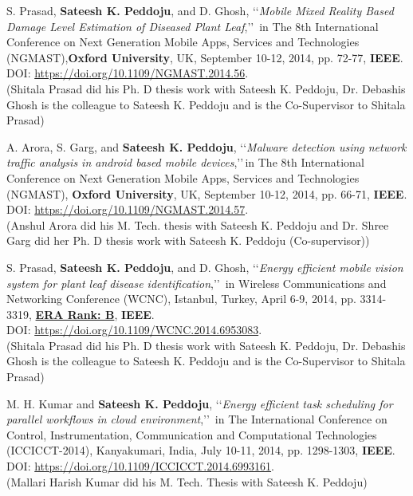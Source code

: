 \begin{etaremune}
	
	\item
	S. Prasad, \textbf{Sateesh K. Peddoju}, and D. Ghosh, \lq\lq \textit{Mobile Mixed Reality Based Damage Level Estimation of Diseased Plant Leaf},\rq\rq\, in The 8th International Conference on Next Generation Mobile Apps, Services and Technologies (NGMAST),\textbf{Oxford University}, UK, September 10-12, 2014, pp. 72-77, \textbf{IEEE}. \\DOI: \url{https://doi.org/10.1109/NGMAST.2014.56}. \\(Shitala Prasad did his Ph. D thesis work with Sateesh K. Peddoju, Dr. Debashis Ghosh is the colleague to Sateesh K. Peddoju and is the Co-Supervisor to Shitala Prasad)

		
	\item
	A. Arora, S. Garg, and \textbf{Sateesh K. Peddoju}, \lq\lq \textit{Malware detection using network traffic analysis in android based mobile devices},\rq\rq\,in The 8th International Conference on Next Generation Mobile Apps, Services and Technologies (NGMAST), \textbf{Oxford University}, UK, September 10-12, 2014, pp. 66-71, \textbf{IEEE}. \\DOI: \url{https://doi.org/10.1109/NGMAST.2014.57}. \\ (Anshul Arora did his  M. Tech. thesis with Sateesh K. Peddoju and Dr. Shree Garg did her Ph. D thesis work with Sateesh K. Peddoju (Co-supervisor))

	
	\item
	S. Prasad, \textbf{Sateesh K. Peddoju}, and D. Ghosh, \lq\lq \textit{Energy efficient mobile vision system for plant leaf disease identification},\rq\rq\, in Wireless Communications and Networking Conference (WCNC), Istanbul, Turkey, April 6-9, 2014, pp. 3314-3319, \underline{\textbf{ERA Rank: B}}, \textbf{IEEE}. \\DOI: \url{https://doi.org/10.1109/WCNC.2014.6953083}. \\(Shitala Prasad did his Ph. D thesis work with Sateesh K. Peddoju, Dr. Debashis Ghosh is the colleague to Sateesh K. Peddoju and is the Co-Supervisor to Shitala Prasad)

	
	\item
	M. H. Kumar and \textbf{Sateesh K. Peddoju}, \lq\lq \textit{Energy efficient task scheduling for parallel workflows in cloud environment},\rq\rq\, in The International Conference on Control, Instrumentation, Communication and Computational Technologies (ICCICCT-2014), Kanyakumari, India, July 10-11, 2014, pp. 1298-1303, \textbf{IEEE}. 
\\DOI: \url{https://doi.org/10.1109/ICCICCT.2014.6993161}. \\(Mallari Harish Kumar did his M. Tech. Thesis with Sateesh K. Peddoju)
	

\end{etaremune}

